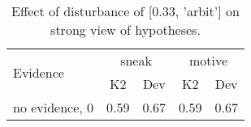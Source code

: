 \begin{table}\begin{tabular}{l|cc|cc}\toprule\multirow{2}{*}{Evidence} & \multicolumn{2}{c}{sneak}& \multicolumn{2}{c}{motive}\\& {K2} & {Dev}& {K2} & {Dev}\\\midrule
no evidence, 0 & \cellcolor{Bittersweet}0.59&\cellcolor{Bittersweet}0.67&\cellcolor{Bittersweet}0.59&\cellcolor{Bittersweet}0.67\\\bottomrule\end{tabular}\caption{Effect of disturbance of [0.33, 'arbit'] on strong view of hypotheses.}\end{table}